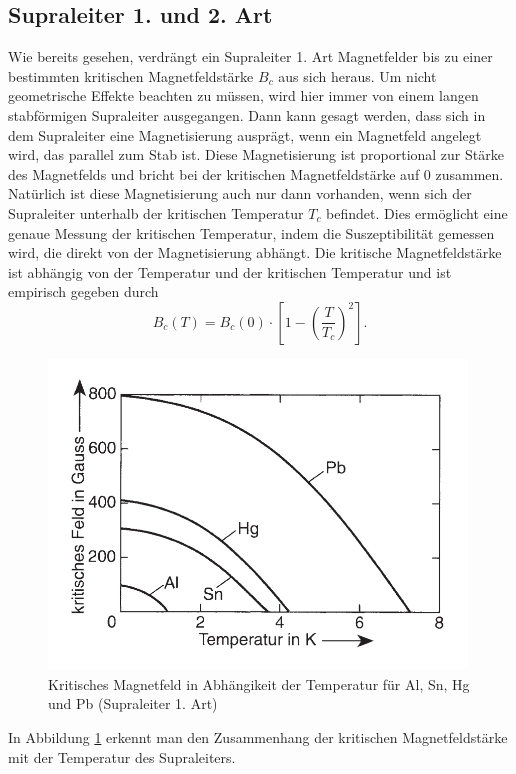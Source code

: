 \subsection{Supraleiter 1. und 2. Art}\label{arten}
Wie bereits gesehen, verdrängt ein Supraleiter 1. Art Magnetfelder bis zu einer bestimmten kritischen Magnetfeldstärke $B_c$ aus sich heraus. Um nicht geometrische Effekte beachten zu müssen, wird hier immer von einem langen stabförmigen Supraleiter ausgegangen. Dann kann gesagt werden, dass sich in dem Supraleiter eine Magnetisierung ausprägt, wenn ein Magnetfeld angelegt wird, das parallel zum Stab ist. Diese Magnetisierung ist proportional zur Stärke des Magnetfelds und bricht bei der kritischen Magnetfeldstärke auf $0$ zusammen. Natürlich ist diese Magnetisierung auch nur dann vorhanden, wenn sich der Supraleiter unterhalb der kritischen Temperatur $T_c$ befindet. Dies ermöglicht eine genaue Messung der kritischen Temperatur, indem die Suszeptibilität gemessen wird, die direkt von der Magnetisierung abhängt. Die kritische Magnetfeldstärke ist abhängig von der Temperatur und der kritischen Temperatur und ist empirisch gegeben durch
\begin{equation}
 B_c(T)=B_c(0)\cdot \left[1-\left(\frac{T}{T_c}\right)^2\right].
\end{equation}
\begin{figure}[htbp]  
     \includegraphics[width=0.99\textwidth]{1_art.png}
  \caption{Kritisches Magnetfeld in Abhängikeit der Temperatur für Al, Sn, Hg und Pb (Supraleiter 1. Art) \cite{supraleitung}}
  \label{1.art}
\end{figure}
In Abbildung \ref{1.art} erkennt man den Zusammenhang der kritischen Magnetfeldstärke mit der Temperatur des Supraleiters.

